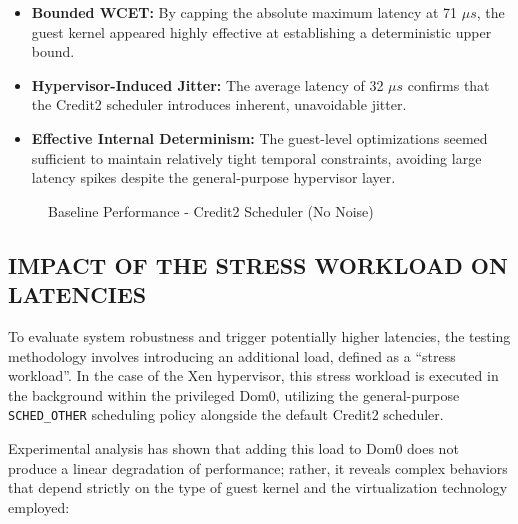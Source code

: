 \begin{itemize}
\item
  \textbf{Bounded WCET:} By capping the absolute maximum latency at 71
  $\mu s$, the guest kernel appeared highly effective at establishing a
  deterministic upper bound.
\item
  \textbf{Hypervisor-Induced Jitter:} The average latency of 32 $\mu s$
  confirms that the Credit2 scheduler introduces inherent, unavoidable
  jitter.
\item
  \textbf{Effective Internal Determinism:} The guest-level optimizations
  seemed sufficient to maintain relatively tight temporal constraints,
  avoiding large latency spikes despite the general-purpose hypervisor
  layer.
\end{itemize}

\begin{figure}
\centering

\caption{Baseline Performance - Credit2 Scheduler (No Noise)}
\end{figure}

\subsection{IMPACT OF THE STRESS WORKLOAD ON
LATENCIES}\label{impact-of-the-stress-workload-on-latencies-1}

To evaluate system robustness and trigger potentially higher latencies,
the testing methodology involves introducing an additional load, defined
as a ``stress workload''. In the case of the Xen hypervisor, this stress
workload is executed in the background within the privileged Dom0,
utilizing the general-purpose \texttt{SCHED\_OTHER} scheduling policy
alongside the default Credit2 scheduler.

Experimental analysis has shown that adding this load to Dom0 does not
produce a linear degradation of performance; rather, it reveals complex
behaviors that depend strictly on the type of guest kernel and the
virtualization technology employed:

